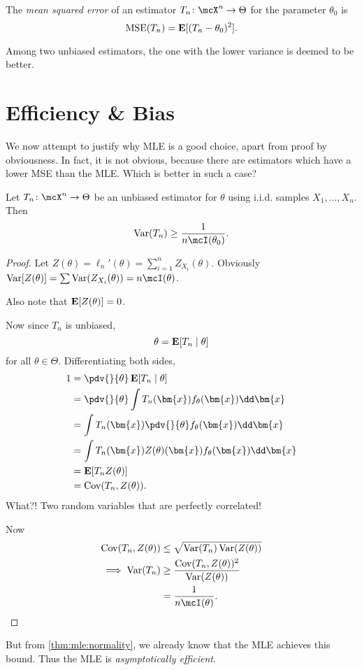 \begin{definition} \label{def:mle:mse}
    The \emph{mean squared error} of an estimator
    $T_n\colon \mcX^n \to \Theta$ for the parameter $\theta_0$ is \[
        \operatorname{MSE}(T_n) = \operatorname*{\textbf{E}}[(T_n - \theta_0)^2].
    \]
\end{definition}
Among two unbiased estimators, the one with the lower variance is deemed
to be better.

\section{Efficiency \& Bias} \label{sec:mle:eff}
We now attempt to justify why MLE is a good choice,
apart from proof by obviousness.
In fact, it is not obvious, because there are estimators which have a
lower MSE than the MLE.
Which is better in such a case?
\begin{theorem*} \label{thm:mle:cramer-rao}
    Let $T_n\colon \mcX^n \to \Theta$ be an unbiased estimator for $\theta$
    using i.i.d. samples $X_1, \ldots, X_n$.
    Then \[
        \Var(T_n) \ge \frac1{n \mcI(\theta_0)}.
    \]
\end{theorem*}
\begin{proof}
    Let $Z(\theta) = \ell_n'(\theta) = \sum_{i=1}^n Z_{X_i}(\theta)$.
    Obviously $\Var[Z(\theta)] = \sum \Var(Z_{X_i}(\theta))
    = n \mcI(\theta)$.

    Also note that $\operatorname*{\textbf{E}}[Z(\theta)] = 0$.

    Now since $T_n$ is unbiased, \[
        \theta = \operatorname*{\textbf{E}}[T_n \mid \theta]
    \] for all $\theta \in \Theta$.
    Differentiating both sides, \begin{align*}
        1 &= \pdv{}{\theta} \E[T_n \given \theta] \\
          &= \pdv{}{\theta} \int T_n(\bm{x}) f_{\theta}(\bm{x}) \dd \bm{x} \\
          &= \int T_n(\bm{x}) \pdv{}{\theta} f_{\theta}(\bm{x}) \dd \bm{x} \\
          &= \int T_n(\bm{x}) Z(\theta)(\bm{x}) f_{\theta}(\bm{x}) \dd \bm{x} \\
          &= \E[T_n Z(\theta)] \\
          &= \Cov(T_n, Z(\theta)).
    \end{align*}
    What?! Two random variables that are perfectly correlated!

    Now \begin{align*}
        \Cov(T_n, Z(\theta)) &\le \sqrt{\Var(T_n) \Var(Z(\theta))} \\
        \implies \Var(T_n) &\ge \frac{\Cov(T_n, Z(\theta))^2}{\Var(Z(\theta))} \\
        &= \frac1{n \mcI(\theta)}. \qedhere
    \end{align*}
\end{proof}

But from \cref{thm:mle:normality}, we already know that the MLE achieves
this bound.
Thus the MLE is \emph{asymptotically efficient}.
